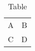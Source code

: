\documentclass{article}
\begin{document}
\begin{table}
    \centering
    \begin{tabular}{|c|c|}
        A & B \\
        C & D
    \end{tabular}
    \caption{Table}
    \label{tab:my_label}
\end{table}
\end{document}

